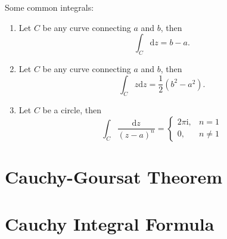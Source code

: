 \begin{proposition}
    Some common integrals:
    \begin{enumerate}
        \item Let \(C\) be any curve connecting \(a\) and \(b\), then
            \[\int_C \mathrm{d}z = b - a.\] 
        \item Let \(C\) be any curve connecting \(a\) and \(b\), then 
            \[\int_C z \mathrm{d}z = \frac{1}{2}(b^2 - a^2).\]
        \item Let \(C\) be a circle, then
            \[\int_C \frac{\mathrm{d}z}{(z-a)^{n}} = \begin{cases} 2\pi \mathrm{i}, & n = 1 \\ 0, & n \neq 1 \end{cases} \] 
    \end{enumerate}
\end{proposition}

\section{Cauchy-Goursat Theorem} %

\section{Cauchy Integral Formula} %